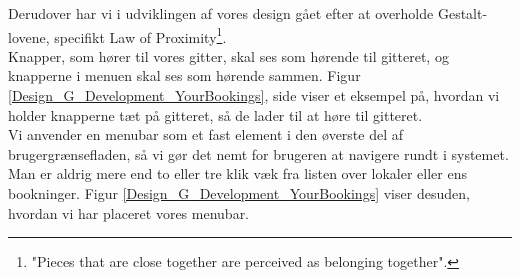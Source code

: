 Derudover har vi i udviklingen af vores design gået efter at overholde Gestalt-lovene\cite[s. 68]{SL_UID}, specifikt Law of Proximity\footnote{"Pieces that are close together are perceived as belonging together".}. 
\\Knapper, som hører til vores gitter, skal ses som hørende til gitteret, og knapperne i menuen skal ses som hørende sammen. Figur \ref{Design_G_Development_YourBookings}, side \pageref{Design_G_Development_YourBookings} viser et eksempel på, hvordan vi holder knapperne tæt på gitteret, så de lader til at høre til gitteret.
\\Vi anvender en menubar som et fast element i den øverste del af brugergrænsefladen, så vi gør det nemt for brugeren at navigere rundt i systemet. Man er aldrig mere end to eller tre klik væk fra listen over lokaler eller ens bookninger. Figur \ref{Design_G_Development_YourBookings} viser desuden, hvordan vi har placeret vores menubar.